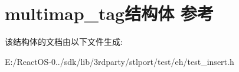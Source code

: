 \hypertarget{structmultimap__tag}{}\section{multimap\+\_\+tag结构体 参考}
\label{structmultimap__tag}


该结构体的文档由以下文件生成\+:\begin{DoxyCompactItemize}
\item 
E\+:/\+React\+O\+S-\/0../sdk/lib/3rdparty/stlport/test/eh/test\+\_\+insert.\+h\end{DoxyCompactItemize}
